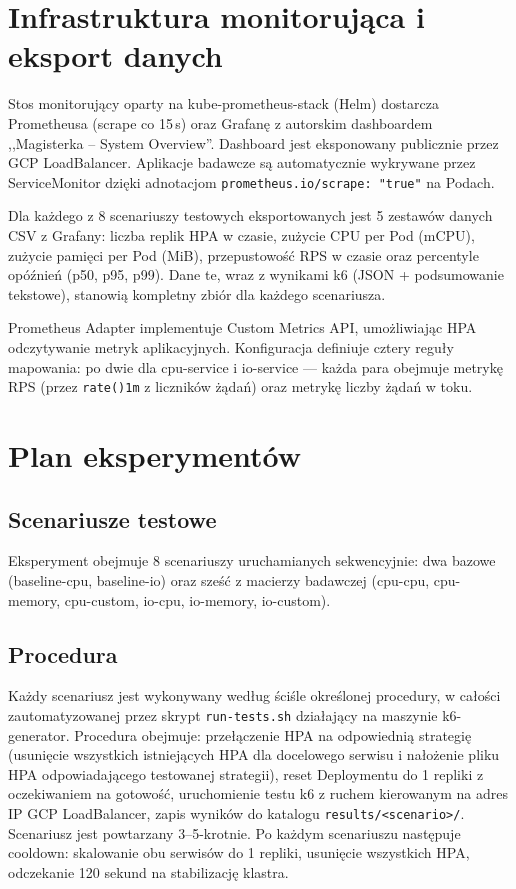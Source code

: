 \section{Infrastruktura monitorująca i eksport danych}

Stos monitorujący oparty na kube-prometheus-stack (Helm) dostarcza Prometheusa (scrape co 15\,s) oraz Grafanę z autorskim dashboardem ,,Magisterka -- System Overview''. Dashboard jest eksponowany publicznie przez GCP LoadBalancer. Aplikacje badawcze są automatycznie wykrywane przez ServiceMonitor dzięki adnotacjom \texttt{prometheus.io/scrape: "true"} na Podach.

Dla każdego z 8 scenariuszy testowych eksportowanych jest 5 zestawów danych CSV z Grafany: liczba replik HPA w czasie, zużycie CPU per Pod (mCPU), zużycie pamięci per Pod (MiB), przepustowość RPS w czasie oraz percentyle opóźnień (p50, p95, p99). Dane te, wraz z wynikami k6 (JSON + podsumowanie tekstowe), stanowią kompletny zbiór dla każdego scenariusza.

Prometheus Adapter implementuje Custom Metrics API, umożliwiając HPA odczytywanie metryk aplikacyjnych. Konfiguracja definiuje cztery reguły mapowania: po dwie dla cpu-service i io-service --- każda para obejmuje metrykę RPS (przez \texttt{rate()\lbrack{}1m\rbrack{}} z liczników żądań) oraz metrykę liczby żądań w toku.

\section{Plan eksperymentów}

\subsection{Scenariusze testowe}

Eksperyment obejmuje 8 scenariuszy uruchamianych sekwencyjnie: dwa bazowe (baseline-cpu, baseline-io) oraz sześć z macierzy badawczej (cpu-cpu, cpu-memory, cpu-custom, io-cpu, io-memory, io-custom).

\subsection{Procedura}

Każdy scenariusz jest wykonywany według ściśle określonej procedury, w całości zautomatyzowanej przez skrypt \texttt{run-tests.sh} działający na maszynie k6-generator. Procedura obejmuje: przełączenie HPA na odpowiednią strategię (usunięcie wszystkich istniejących HPA dla docelowego serwisu i nałożenie pliku HPA odpowiadającego testowanej strategii), reset Deploymentu do 1 repliki z oczekiwaniem na gotowość, uruchomienie testu k6 z ruchem kierowanym na adres IP GCP LoadBalancer, zapis wyników do katalogu \texttt{results/<scenario>/}. Scenariusz jest powtarzany 3--5-krotnie. Po każdym scenariuszu następuje cooldown: skalowanie obu serwisów do 1 repliki, usunięcie wszystkich HPA, odczekanie 120 sekund na stabilizację klastra.

